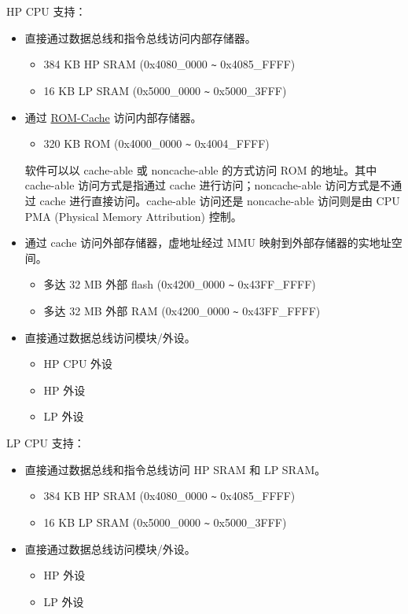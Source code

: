 \documentclass[main\_\_CN.tex]{subfiles}
\begin{document}
HP CPU 支持：
\begin{itemize}
\item 直接通过数据总线和指令总线访问内部存储器。
  \begin{itemize}
        \item 384 KB HP SRAM (0x4080\_0000 \verb+~+ 0x4085\_FFFF)
        \item 16 KB LP SRAM  (0x5000\_0000 \verb+~+ 0x5000\_3FFF)
    \end{itemize}
\item 通过 \hyperlink{par:rom}{ROM-Cache} 访问内部存储器。
    \begin{itemize}
        \item 320 KB ROM (0x4000\_0000 \verb+~+ 0x4004\_FFFF)
    \end{itemize}

\begin{tiplisting}
软件可以以 cache-able 或 noncache-able 的方式访问 ROM 的地址。其中 cache-able 访问方式是指通过 cache 进行访问；noncache-able 访问方式是不通过 cache 进行直接访问。cache-able 访问还是 noncache-able 访问则是由 CPU PMA (Physical Memory Attribution) 控制。
\end{tiplisting}
\item 通过 cache 访问外部存储器，虚地址经过 MMU 映射到外部存储器的实地址空间。
    \begin{itemize}
        \item 多达 32 MB 外部 flash (0x4200\_0000 \verb+~+ 0x43FF\_FFFF)
        \item 多达 32 MB 外部 RAM (0x4200\_0000 \verb+~+ 0x43FF\_FFFF)
    \end{itemize}
\item 直接通过数据总线访问模块/外设。
    \begin{itemize}
        \item HP CPU 外设
        \item HP 外设
        \item LP 外设
    \end{itemize}
\end{itemize}

LP CPU 支持：
\begin{itemize}
    \item 直接通过数据总线和指令总线访问 HP SRAM 和 LP SRAM。
     \begin{itemize}
        \item 384 KB HP SRAM (0x4080\_0000 \verb+~+ 0x4085\_FFFF)
        \item 16 KB LP SRAM  (0x5000\_0000 \verb+~+ 0x5000\_3FFF)
    \end{itemize}
    \item 直接通过数据总线访问模块/外设。
    \begin{itemize}
        \item HP 外设
        \item LP 外设
    \end{itemize}
\end{itemize}
\end{document}
